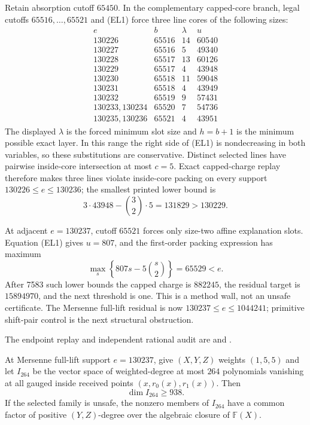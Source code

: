 \documentclass[11pt,a4paper]{amsart}
\numberwithin{equation}{section}
\theoremstyle{remark}
\newcommand{\F}{\mathbb F}\newcommand{\B}{\mathbb B}\newcommand{\K}{\mathbb K}\newcommand{\Z}{\mathbb Z}
\begin{document}
\begin{remark}
Retain absorption cutoff $65450$.  In the complementary capped-core branch,
legal cutoffs $65516,\ldots,65521$ and (EL1) force three line cores of the
following sizes:
\[
\begin{array}{c|c|c|c}
e&b&\lambda&u\\ \hline
130226&65516&14&60540\\
130227&65516&5&49340\\
130228&65517&13&60126\\
130229&65517&4&43948\\
130230&65518&11&59048\\
130231&65518&4&43949\\
130232&65519&9&57431\\
130233,130234&65520&7&54736\\
130235,130236&65521&4&43951
\end{array}
\]
The displayed $\lambda$ is the forced minimum slot size and $h=b+1$ is the
minimum possible exact layer.  In this range the right side of (EL1) is
nondecreasing in both variables, so these substitutions are conservative.
Distinct selected lines have pairwise inside-core intersection at most
$c=5$.  Exact capped-charge replay therefore makes three lines violate
inside-core packing on every support $130226\le e\le130236$; the smallest
printed lower bound is
\[
 3\cdot43948-\binom32\cdot5=131829>130229.
\]

At adjacent $e=130237$, cutoff $65521$ forces only size-two affine
explanation slots.  Equation (EL1) gives $u=807$, and the first-order
packing expression has maximum
\[
 \max_s\left\{807s-5\binom{s}{2}\right\}=65529<e.
\]
After 7583 such lower bounds the capped charge is $882245$, the residual
target is $15894970$, and the next threshold is one.  This is a method wall,
not an unsafe certificate.  The Mersenne full-lift residual is now
$130237\le e\le1044241$; primitive shift-pair control is the next structural
obstruction.

The endpoint replay and independent rational audit are
and
.
\end{remark}

\begin{corollary}
\label{cor:full-lift-interpolation-common-factor-router}
At Mersenne full-lift support $e=130237$, give $(X,Y,Z)$ weights
$(1,5,5)$ and let $I_{264}$ be the vector space of weighted-degree at most
$264$ polynomials vanishing at all gauged inside received points
$(x,r_0(x),r_1(x))$.  Then
\[
 \dim I_{264}\ge 938.                              \tag{IF1}
\]
If the selected family is unsafe, the nonzero members of $I_{264}$ have a
common factor of positive $(Y,Z)$-degree over the algebraic closure of
$\F(X)$.
\end{corollary}
\end{document}
